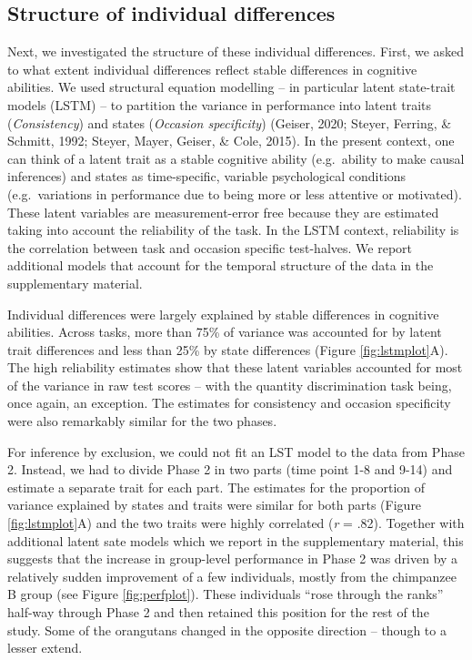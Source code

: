 \documentclass[
  man,floatsintext]{apa6}
\begin{document}
\hypertarget{structure-of-individual-differences}{%
\subsection{Structure of individual differences}\label{structure-of-individual-differences}}

Next, we investigated the structure of these individual differences. First, we asked to what extent individual differences reflect stable differences in cognitive abilities. We used structural equation modelling -- in particular latent state-trait models (LSTM) -- to partition the variance in performance into latent traits (\emph{Consistency}) and states (\emph{Occasion specificity}) (Geiser, 2020; Steyer, Ferring, \& Schmitt, 1992; Steyer, Mayer, Geiser, \& Cole, 2015). In the present context, one can think of a latent trait as a stable cognitive ability (e.g.~ability to make causal inferences) and states as time-specific, variable psychological conditions (e.g.~variations in performance due to being more or less attentive or motivated). These latent variables are measurement-error free because they are estimated taking into account the reliability of the task. In the LSTM context, reliability is the correlation between task and occasion specific test-halves. We report additional models that account for the temporal structure of the data in the supplementary material.

Individual differences were largely explained by stable differences in cognitive abilities. Across tasks, more than 75\% of variance was accounted for by latent trait differences and less than 25\% by state differences (Figure \ref{fig:lstmplot}A). The high reliability estimates show that these latent variables accounted for most of the variance in raw test scores -- with the quantity discrimination task being, once again, an exception. The estimates for consistency and occasion specificity were also remarkably similar for the two phases.

For inference by exclusion, we could not fit an LST model to the data from Phase 2. Instead, we had to divide Phase 2 in two parts (time point 1-8 and 9-14) and estimate a separate trait for each part. The estimates for the proportion of variance explained by states and traits were similar for both parts (Figure \ref{fig:lstmplot}A) and the two traits were highly correlated (\emph{r} = .82). Together with additional latent sate models which we report in the supplementary material, this suggests that the increase in group-level performance in Phase 2 was driven by a relatively sudden improvement of a few individuals, mostly from the chimpanzee B group (see Figure \ref{fig:perfplot}). These individuals ``rose through the ranks'' half-way through Phase 2 and then retained this position for the rest of the study. Some of the orangutans changed in the opposite direction -- though to a lesser extend.
\end{document}
